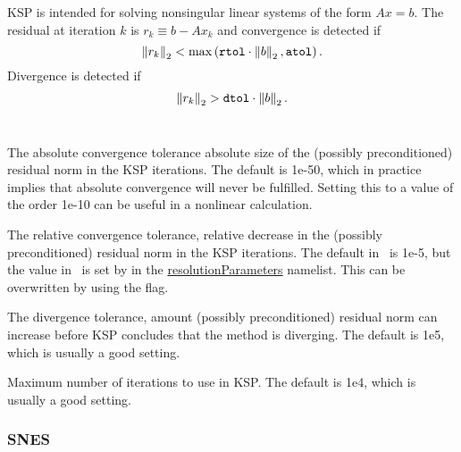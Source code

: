 KSP is intended for solving nonsingular linear systems of the form $A x = b$. 
The residual at iteration $k$ is $r_k \equiv b - A x_k$ and convergence is detected if
\[
\left\|r_k\right\|_2 < \mathrm{max} \left(\text{\ttfamily rtol} \cdot \left\|b\right\|_2, \text{\ttfamily atol}\right).
\]
Divergence is detected if
\[
\left\|r_k\right\|_2 > \text{\ttfamily dtol} \cdot \left\|b\right\|_2.
\]
\\

\myhrule

{The absolute convergence tolerance absolute size of the (possibly preconditioned) residual norm in the KSP iterations. 
The default is {\ttfamily 1e-50}, which in practice implies that absolute convergence will never be fulfilled. 
Setting this to a value of the order {\ttfamily 1e-10} can be useful in a nonlinear calculation.}

\myhrule

{The relative convergence tolerance, relative decrease in the (possibly preconditioned) residual norm in the KSP iterations. 
The default in \PETSc~is {\ttfamily 1e-5}, 
but the value in \sfincs~is set by  in the {\ttfamily \hyperref[sec:resolutionParameters]{resolutionParameters}} namelist. This can be overwritten by using the flag.}

\myhrule

{The divergence tolerance, amount (possibly preconditioned) residual norm can increase before KSP concludes that the method is diverging.
The default is {\ttfamily 1e5}, which is usually a good setting.}

\myhrule

{Maximum number of iterations to use in KSP. 
The default is {\ttfamily 1e4}, which is usually a good setting.} 

\subsubsection{SNES}

